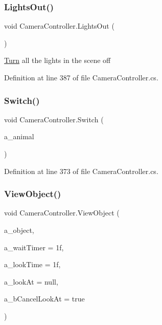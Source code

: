 \subsubsection{\texorpdfstring{Lights\+Out()}{LightsOut()}}
{\footnotesize\ttfamily void Camera\+Controller.\+Lights\+Out (\begin{DoxyParamCaption}{ }\end{DoxyParamCaption})}



\mbox{\hyperlink{class_turn}{Turn}} all the lights in the scene off 



Definition at line 387 of file Camera\+Controller.\+cs.

\mbox{\label{class_camera_controller_ae466f73db5ef581ce90cb69f1f66605a}} 
\subsubsection{\texorpdfstring{Switch()}{Switch()}}
{\footnotesize\ttfamily void Camera\+Controller.\+Switch (\begin{DoxyParamCaption}\item[{\mbox{\hyperlink{class_animal}{Animal}}}]{a\+\_\+animal }\end{DoxyParamCaption})}



Definition at line 373 of file Camera\+Controller.\+cs.

\mbox{\label{class_camera_controller_a5fac91ad6dfd73b67cbec8e427b4736e}} 
\subsubsection{\texorpdfstring{View\+Object()}{ViewObject()}}
{\footnotesize\ttfamily void Camera\+Controller.\+View\+Object (\begin{DoxyParamCaption}\item[{Game\+Object}]{a\+\_\+object,  }\item[{float}]{a\+\_\+wait\+Timer = {\ttfamily 1f},  }\item[{float}]{a\+\_\+look\+Time = {\ttfamily 1f},  }\item[{Transform}]{a\+\_\+look\+At = {\ttfamily null},  }\item[{bool}]{a\+\_\+b\+Cancel\+Look\+At = {\ttfamily true} }\end{DoxyParamCaption})}



